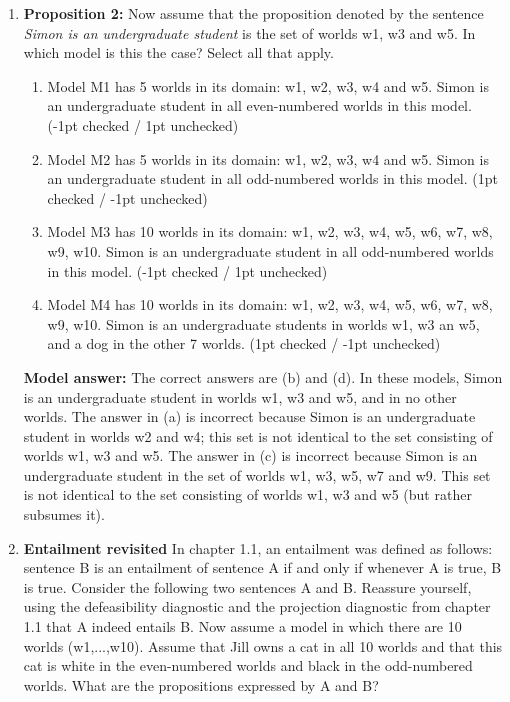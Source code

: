 \documentclass[a4,11pt]{article}
\begin{document}
\begin{enumerate}[leftmargin = 12pt]
        {\bf Model answer:} The correct answers are domain and interpretation as per definition on p.35: `A domain and interpretation taken together are called a model.'
    
  
      \item {\bf Proposition 2:}  Now assume that the proposition denoted by the sentence  \textit{Simon is an undergraduate student} is the set of worlds w1, w3 and w5. In which model is this the case? Select all that apply. 
            
       \begin{enumerate}[noitemsep]
       \item Model M1 has 5 worlds in its domain: w1, w2, w3, w4 and w5. Simon is an undergraduate student in all even-numbered worlds in this model. (-1pt checked / 1pt unchecked)
       \item Model M2 has 5 worlds in its domain: w1, w2, w3, w4 and w5. Simon is an undergraduate student in all odd-numbered worlds in this model. (1pt checked / -1pt unchecked)
       \item Model M3 has 10 worlds in its domain: w1, w2, w3, w4, w5, w6, w7, w8, w9, w10. Simon is an undergraduate student in all odd-numbered worlds in this model. (-1pt checked / 1pt unchecked) 
       \item Model M4 has 10 worlds in its domain: w1, w2, w3, w4, w5, w6, w7, w8, w9, w10. Simon is an undergraduate students in worlds w1, w3 an w5, and a dog in the other 7 worlds. (1pt checked / -1pt unchecked)
    \end{enumerate}     
  
 {\bf Model answer:} The correct answers are (b) and (d). In these models, Simon is an undergraduate student in worlds w1, w3 and w5, and in no other worlds. The answer in (a) is incorrect because Simon is an undergraduate student in worlds w2 and w4; this set is not identical to the set consisting of worlds w1, w3 and w5. The answer in (c) is incorrect because Simon is an undergraduate student in the set of worlds w1, w3, w5, w7 and w9. This set is not identical to the set consisting of worlds w1, w3 and w5 (but rather subsumes it). 
         
\item {\bf Entailment revisited} In chapter 1.1, an entailment was defined as follows: sentence B is an entailment of sentence A if and only if whenever A is true, B is true. Consider the following two sentences A and B. Reassure yourself, using the defeasibility diagnostic and the projection diagnostic from chapter 1.1 that A indeed entails B.  Now assume a model in which there are 10 worlds (w1,...,w10). Assume that Jill owns a cat in all 10 worlds and that this cat is white in the even-numbered worlds and black in the odd-numbered worlds. What are the propositions expressed by A and B?


\end{enumerate}
\end{document}
